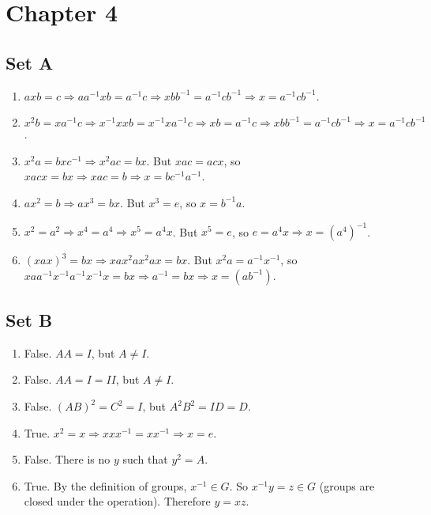 \section{Chapter 4}
\subsection{Set A}
\begin{enumerate}
    \item $axb = c \Rightarrow aa^{-1}xb = a^{-1}c \Rightarrow xbb^{-1} = a^{-1}cb^{-1} \Rightarrow x = a^{-1}cb^{-1}$.
    \item $x^2b = xa^{-1}c \Rightarrow x^{-1}xxb = x^{-1}xa^{-1}c \Rightarrow xb = a^{-1}c \Rightarrow xbb^{-1} = a^{-1}cb^{-1} \Rightarrow x = a^{-1}cb^{-1}$.
    \item $x^2a = bxc^{-1} \Rightarrow x^2ac = bx$. But $xac = acx$, so $xacx = bx \Rightarrow xac = b \Rightarrow x = bc^{-1}a^{-1}$.
    \item $ax^2 = b \Rightarrow ax^3 = bx$. But $x^3 = e$, so $x = b^{-1}a$.
    \item $x^2 = a^2 \Rightarrow x^4 = a^4 \Rightarrow x^5 = a^4x$. But $x^5 = e$, so $e = a^4x \Rightarrow x = (a^4)^{-1}$.
    \item $(xax)^3 = bx \Rightarrow xax^2ax^2ax = bx$. But $x^2a = a^{-1}x^{-1}$, so $xaa^{-1}x^{-1}a^{-1}x^{-1}x = bx \Rightarrow a^{-1} = bx \Rightarrow x = (ab^{-1})$.
\end{enumerate}

\subsection{Set B}
\begin{enumerate}
    \item False. $AA = I$, but $A \ne I$.
    \item False. $AA = I = II$, but $A \ne I$.
    \item False. $(AB)^2 = C^2 = I$, but $A^2B^2 = ID = D$.
    \item True. $x^2 = x \Rightarrow xxx^{-1} = xx^{-1} \Rightarrow x = e$.
    \item False. There is no $y$ such that $y^2 = A$.
    \item True. By the definition of groups, $x^{-1} \in G$. So $x^{-1}y = z \in G$ (groups are closed under the operation). Therefore $y = xz$. 
\end{enumerate}

